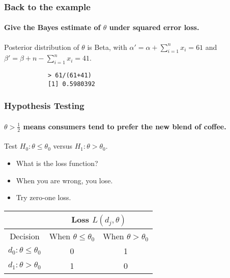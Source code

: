 \documentclass[12pt]{beamer}
\begin{document}
	\begin{frame}[fragile]
		\frametitle{Back to the example}
		\framesubtitle{Give the Bayes estimate of $\theta$ under squared error loss.}
		
		Posterior distribution of $\theta$ is Beta, with $\alpha' = \alpha + \sum_{i=1}^n x_i = 61$ 
		and $\beta' = \beta + n - \sum_{i=1}^n x_i = 41$.
		
		\begin{verbatim}
			> 61/(61+41)
			[1] 0.5980392
		\end{verbatim}
		
	\end{frame}
	\begin{frame}
		\frametitle{Hypothesis Testing}
		\framesubtitle{$\theta > \frac{1}{2}$ means consumers tend to prefer the new blend of coffee.}
		
		Test $H_0 : \theta \leq \theta_0$ versus $H_1 : \theta > \theta_0$.
		
		\begin{itemize}[label={\color{blue}$\blacktriangleright$}]
			\item What is the loss function?
			\item When you are wrong, you lose.
			\item Try zero-one loss.
		\end{itemize}
		
		\begin{center}
			\begin{tabular}{|c|c|c|}
				\hline
				& \multicolumn{2}{c|}{Loss $L(d_j,\theta)$} \\
				\hline
				Decision & When $\theta \leq \theta_0$ & When $\theta > \theta_0$ \\
				\hline
				$d_0: \theta \leq \theta_0$ & 0 & 1 \\
				\hline
				$d_1: \theta > \theta_0$ & 1 & 0 \\
				\hline
			\end{tabular}
		\end{center}
		
	\end{frame}
\end{document}
